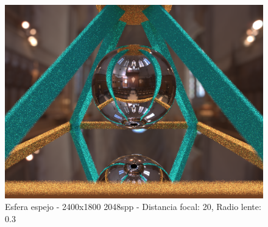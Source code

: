 \documentclass[10pt,oneside,a4paper]{article}
\begin{document}
\begin{figure}[h]
\centering
\includegraphics[width=1\linewidth]{images/escenamirror_2400x1800_2048spp_dof20-03_screencap.png}
\caption{Esfera espejo - 2400x1800 2048spp - Distancia focal: 20, Radio lente: 0.3}
\label{fig:disp}
\end{figure}
\end{document}
